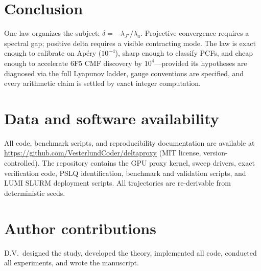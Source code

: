 \documentclass[11pt]{article}
\begin{document}
\section{Conclusion}

One law organizes the subject: $\delta = -\lambda_{J^\star}/\lambda_a$. Projective convergence requires a spectral gap; positive delta requires a visible contracting mode. The law is exact enough to calibrate on Ap\'ery ($10^{-4}$), sharp enough to classify PCFs, and cheap enough to accelerate 6F5 CMF discovery by $10^4$---provided its hypotheses are diagnosed via the full Lyapunov ladder, gauge conventions are specified, and every arithmetic claim is settled by exact integer computation.

\section*{Data and software availability}

All code, benchmark scripts, and reproducibility documentation are available at \url{https://github.com/VesterlundCoder/deltaproxy} (MIT license, version-controlled). The repository contains the GPU proxy kernel, sweep drivers, exact verification code, PSLQ identification, benchmark and validation scripts, and LUMI SLURM deployment scripts. All trajectories are re-derivable from deterministic seeds.

\section*{Author contributions}

D.V.\ designed the study, developed the theory, implemented all code, conducted all experiments, and wrote the manuscript.
\end{document}
